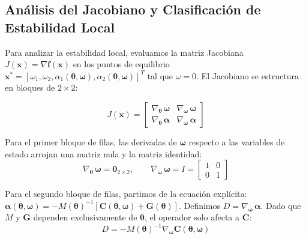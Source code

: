 \documentclass[13pt]{extarticle}
\begin{document}
\subsection{Análisis del Jacobiano y Clasificación de Estabilidad Local}

Para analizar la estabilidad local, evaluamos la matriz Jacobiana $J(\mathbf{x}) = \nabla \mathbf{f}(\mathbf{x})$ en los puntos de equilibrio $\mathbf{x}^* = [\omega_1, \omega_2, \alpha_1(\boldsymbol{\theta}, \boldsymbol{\omega}), \alpha_2(\boldsymbol{\theta}, \boldsymbol{\omega}) ]^T$ tal que $ \omega = 0$. El Jacobiano se estructura en bloques de $2 \times 2$:

\begin{equation}
    J(\mathbf{x}) = 
    \begin{bmatrix}
    \nabla_{\boldsymbol{\theta}} \, \boldsymbol{\omega} & \nabla_{\boldsymbol{\omega}} \, \boldsymbol{\omega} \\[0.5em]
    \nabla_{\boldsymbol{\theta}} \, \boldsymbol{\alpha} & \nabla_{\boldsymbol{\omega}} \, \boldsymbol{\alpha}
    \end{bmatrix}
\end{equation}

Para el primer bloque de filas, las derivadas de $\boldsymbol{\omega}$ respecto a las variables de estado arrojan una matriz nula y la matriz identidad:
\begin{equation}
    \nabla_{\boldsymbol{\theta}} \, \boldsymbol{\omega} = \mathbf{0}_{2\times2}, \qquad \nabla_{\boldsymbol{\omega}} \, \boldsymbol{\omega} = I = \begin{bmatrix} 1 & 0 \\ 0 & 1 \end{bmatrix}
\end{equation}

Para el segundo bloque de filas, partimos de la ecuación explícita: $\boldsymbol{\alpha}(\boldsymbol{\theta}, \boldsymbol{\omega}) = -M(\boldsymbol{\theta})^{-1} [\mathbf{C}(\boldsymbol{\theta}, \boldsymbol{\omega}) + \mathbf{G}(\boldsymbol{\theta})]$. Definimos $D = \nabla_{\boldsymbol{\omega}} \, \boldsymbol{\alpha}$. Dado que $M$ y $\mathbf{G}$ dependen exclusivamente de $\boldsymbol{\theta}$, el operador solo afecta a $\mathbf{C}$:
\begin{equation}
    D = -M(\boldsymbol{\theta})^{-1} \nabla_{\boldsymbol{\omega}} \mathbf{C}(\boldsymbol{\theta}, \boldsymbol{\omega})
\end{equation}
\end{document}
